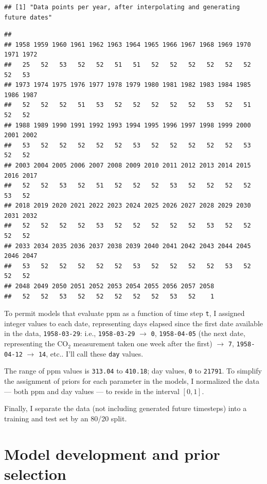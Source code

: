 \documentclass[]{article}
\begin{document}
\begin{verbatim}
## [1] "Data points per year, after interpolating and generating future dates"
\end{verbatim}

\begin{verbatim}
## 
## 1958 1959 1960 1961 1962 1963 1964 1965 1966 1967 1968 1969 1970 1971 1972 
##   25   52   53   52   52   51   51   52   52   52   52   52   52   52   53 
## 1973 1974 1975 1976 1977 1978 1979 1980 1981 1982 1983 1984 1985 1986 1987 
##   52   52   52   51   53   52   52   52   52   52   53   52   51   52   52 
## 1988 1989 1990 1991 1992 1993 1994 1995 1996 1997 1998 1999 2000 2001 2002 
##   53   52   52   52   52   52   53   52   52   52   52   52   53   52   52 
## 2003 2004 2005 2006 2007 2008 2009 2010 2011 2012 2013 2014 2015 2016 2017 
##   52   52   53   52   51   52   52   52   53   52   52   52   52   53   52 
## 2018 2019 2020 2021 2022 2023 2024 2025 2026 2027 2028 2029 2030 2031 2032 
##   52   52   52   52   53   52   52   52   52   52   53   52   52   52   52 
## 2033 2034 2035 2036 2037 2038 2039 2040 2041 2042 2043 2044 2045 2046 2047 
##   53   52   52   52   52   52   53   52   52   52   52   53   52   52   52 
## 2048 2049 2050 2051 2052 2053 2054 2055 2056 2057 2058 
##   52   52   53   52   52   52   52   52   53   52    1
\end{verbatim}

To permit models that evaluate ppm as a function of time step
\texttt{t}, I assigned integer values to each date, representing days
elapsed since the first date available in the data, \texttt{1958-03-29}:
i.e., \texttt{1958-03-29} \(\rightarrow\) \texttt{0},
\texttt{1958-04-05} (the next date, representing the CO\(_2\)
measurement taken one week after the first) \(\rightarrow\) \texttt{7},
\texttt{1958-04-12} \(\rightarrow\) \texttt{14}, etc.. I'll call these
\texttt{day} values. \newline

The range of ppm values is \texttt{313.04} to \texttt{410.18}; day
values, \texttt{0} to \texttt{21791}. To simplify the assignment of
priors for each parameter in the models, I normalized the data --- both
ppm and day values --- to reside in the interval \([0, 1]\). \newline

Finally, I separate the data (not including generated future timesteps)
into a training and test set by an 80/20 split. \newline

\hypertarget{model-development-and-prior-selection}{%
\section{Model development and prior
selection}\label{model-development-and-prior-selection}}
\end{document}
